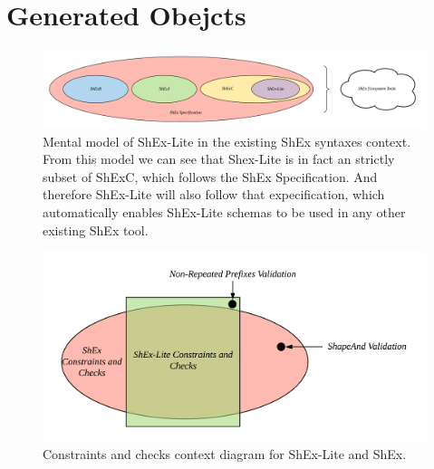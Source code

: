 \section{Generated Obejcts}

\begin{figure}
    \includegraphics[width=\textwidth]{images/shex-lite-syntaxes-mental-model.png}
    \centering
    \caption[Mental model of ShEx-Lite in the existing ShEx syntaxes context.]{Mental model of
    ShEx-Lite in the existing ShEx syntaxes context. From this model we can see that Shex-Lite
    is in fact an strictly subset of ShExC, which follows the ShEx Specification. And therefore
    ShEx-Lite will also follow that expecification, which automatically enables ShEx-Lite schemas
    to be used in any other existing ShEx tool.}
    \label{fig:syntax-mental-model}
\end{figure}

\begin{figure}
  \includegraphics[width=\textwidth]{images/shex-lite-constraints-context.png}
  \centering
  \caption[Constraints and checks context diagram for ShEx-Lite and ShEx.]{Constraints
  and checks context diagram for ShEx-Lite and ShEx.}
  \label{fig:constraints-context}
\end{figure}

